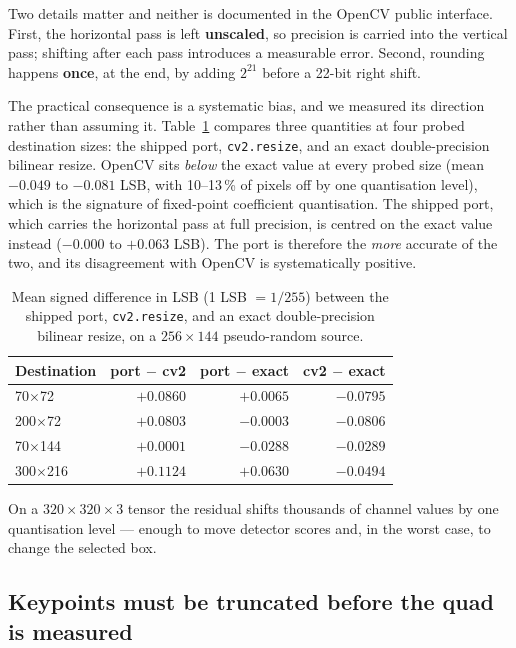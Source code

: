 \documentclass[journal]{IEEEtran}
\begin{document}
Two details matter and neither is documented in the OpenCV public interface.
First, the horizontal pass is left \textbf{unscaled}, so precision is carried
into the vertical pass; shifting after each pass introduces a measurable error.
Second, rounding happens \textbf{once}, at the end, by adding $2^{21}$ before a
22-bit right shift.

The practical consequence is a systematic bias, and we measured its direction
rather than assuming it. Table~\ref{tab:bias} compares three quantities at four
probed destination sizes: the shipped port, \texttt{cv2.resize}, and an exact
double-precision bilinear resize. OpenCV sits \emph{below} the exact value at
every probed size (mean $-0.049$ to $-0.081$ LSB, with 10--13\,\% of pixels off
by one quantisation level), which is the signature of fixed-point coefficient
quantisation. The shipped port, which carries the horizontal pass at full
precision, is centred on the exact value instead ($-0.000$ to $+0.063$ LSB). The
port is therefore the \emph{more} accurate of the two, and its disagreement with
OpenCV is systematically positive.

\begin{table}[t]
\centering
\caption{Mean signed difference in LSB (1 LSB $=1/255$) between the shipped port,
\texttt{cv2.resize}, and an exact double-precision bilinear resize, on a
$256\times144$ pseudo-random source.}
\label{tab:bias}
\footnotesize
\begin{tabular}{@{}lrrr@{}}
\hline
\textbf{Destination} & \textbf{port $-$ cv2} & \textbf{port $-$ exact} & \textbf{cv2 $-$ exact}\\
\hline
70$\times$72   & $+0.0860$ & $+0.0065$ & $-0.0795$\\
200$\times$72  & $+0.0803$ & $-0.0003$ & $-0.0806$\\
70$\times$144  & $+0.0001$ & $-0.0288$ & $-0.0289$\\
300$\times$216 & $+0.1124$ & $+0.0630$ & $-0.0494$\\
\hline
\end{tabular}
\end{table}

On a $320\times320\times3$ tensor the residual shifts thousands of channel values
by one quantisation level --- enough to move detector scores and, in the worst
case, to change the selected box.

\subsection{Keypoints must be truncated before the quad is measured}
\label{sec:trunc}
\end{document}

